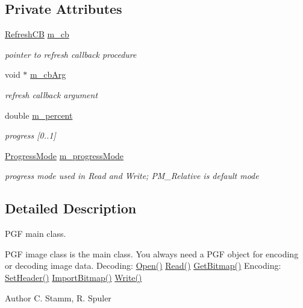 \subsection*{Private Attributes}
\begin{DoxyCompactItemize}
\item 
\mbox{\hyperlink{PGFtypes_8h_a80e898ce785fbd6fb0dfcc5903be79c2}{Refresh\+CB}} \mbox{\hyperlink{classCPGFImage_ac262a389df92493dfca63b2f1f06fe78}{m\+\_\+cb}}
\begin{DoxyCompactList}\small\item\em pointer to refresh callback procedure \end{DoxyCompactList}\item 
void $\ast$ \mbox{\hyperlink{classCPGFImage_a45861a83c95188610063233149187f3c}{m\+\_\+cb\+Arg}}
\begin{DoxyCompactList}\small\item\em refresh callback argument \end{DoxyCompactList}\item 
double \mbox{\hyperlink{classCPGFImage_adc2499451b8f96483a892e53fe5849b1}{m\+\_\+percent}}
\begin{DoxyCompactList}\small\item\em progress \mbox{[}0..1\mbox{]} \end{DoxyCompactList}\item 
\mbox{\hyperlink{PGFtypes_8h_a04561479f4f8aa5a0775d8b541a1157e}{Progress\+Mode}} \mbox{\hyperlink{classCPGFImage_a8b4d6d5ef343f0f428b35c9bf1020569}{m\+\_\+progress\+Mode}}
\begin{DoxyCompactList}\small\item\em progress mode used in Read and Write; P\+M\+\_\+\+Relative is default mode \end{DoxyCompactList}\end{DoxyCompactItemize}


\subsection{Detailed Description}
P\+GF main class. 

P\+GF image class is the main class. You always need a P\+GF object for encoding or decoding image data. Decoding\+: \mbox{\hyperlink{classCPGFImage_adbe9092b915a2c5b2361f4db186b991c}{Open()}} \mbox{\hyperlink{classCPGFImage_a4a1d49cdf9da6934381bb25332d85ccf}{Read()}} \mbox{\hyperlink{classCPGFImage_a6a79885f55b60739b16fb961efb041ce}{Get\+Bitmap()}} Encoding\+: \mbox{\hyperlink{classCPGFImage_a200790d3be292a19fe8cbdd78ddfc386}{Set\+Header()}} \mbox{\hyperlink{classCPGFImage_a3c0895f4738c5222de1920c941a71541}{Import\+Bitmap()}} \mbox{\hyperlink{classCPGFImage_acd13d233dceaeefce3def7d71ebf4f82}{Write()}} \begin{DoxyAuthor}{Author}
C. Stamm, R. Spuler 
\end{DoxyAuthor}


